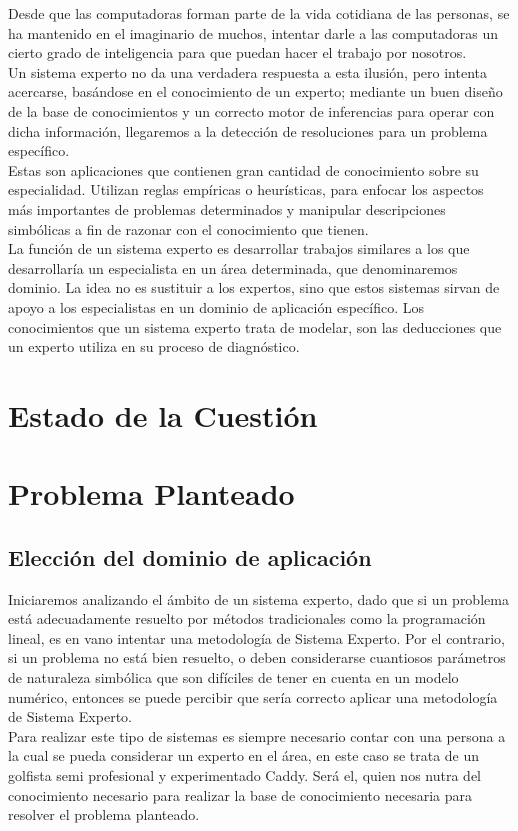 \documentclass[runningheads,a4paper]{llncs}
\begin{document}
Desde que las computadoras forman parte de la vida cotidiana de las personas, se ha mantenido en el imaginario de muchos, intentar darle a las computadoras un cierto grado de inteligencia para que puedan hacer el trabajo por nosotros.\\
Un sistema experto no da una verdadera respuesta a esta ilusión, pero intenta acercarse, basándose en el conocimiento de un experto; mediante un buen diseño de la base de conocimientos y un correcto motor de inferencias para operar con dicha información, llegaremos a la detección de resoluciones para un problema específico.\\
Estas son aplicaciones que contienen gran cantidad de conocimiento sobre su especialidad. Utilizan reglas empíricas o heurísticas, para enfocar los aspectos más importantes de problemas determinados y manipular descripciones simbólicas a fin de razonar con el conocimiento que tienen.\cite{Samper} \\ 
La función de un sistema experto es desarrollar trabajos similares a los que desarrollaría un especialista en un área determinada, que denominaremos dominio. La idea no es sustituir a los expertos, sino que estos sistemas sirvan de apoyo a los especialistas en un dominio de aplicación específico.
Los conocimientos que un sistema experto trata de modelar, son las deducciones que un experto utiliza en su proceso de diagnóstico.\\

\section{Estado de la Cuestión}

\section{Problema Planteado}
\subsection{Elección del dominio de aplicación}
Iniciaremos analizando el ámbito de un sistema experto, dado que si un problema está adecuadamente resuelto por métodos tradicionales como la programación lineal, es en vano intentar una metodología de Sistema Experto. Por el contrario, si un problema no está bien resuelto, o deben considerarse cuantiosos parámetros de naturaleza simbólica que son difíciles de tener en cuenta en un modelo numérico, entonces se puede percibir que sería correcto aplicar una metodología de Sistema Experto.\\
Para realizar este tipo de sistemas es siempre necesario contar con una persona a la cual se pueda considerar un experto en el área, en este caso se trata de un golfista semi profesional y experimentado Caddy. Será el, quien nos nutra del conocimiento necesario para realizar la base de conocimiento necesaria para resolver el problema planteado.\\
\end{document}
